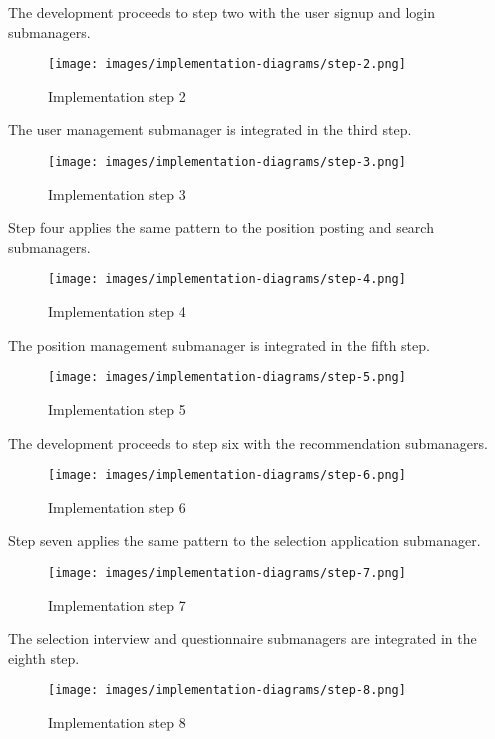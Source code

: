 The development proceeds to step two with the user signup and login submanagers.

\begin{figure}[h]
    \centering
    \texttt{[image: images/implementation-diagrams/step-2.png]}
    \caption{Implementation step 2}
\end{figure}

\clearpage
The user management submanager is integrated in the third step.

\begin{figure}[h]
    \centering
    \texttt{[image: images/implementation-diagrams/step-3.png]}
    \caption{Implementation step 3}
\end{figure}

\clearpage
Step four applies the same pattern to the position posting and search submanagers.

\begin{figure}[h]
    \centering
    \texttt{[image: images/implementation-diagrams/step-4.png]}
    \caption{Implementation step 4}
\end{figure}

\clearpage
The position management submanager is integrated in the fifth step.

\begin{figure}[h]
    \centering
    \texttt{[image: images/implementation-diagrams/step-5.png]}
    \caption{Implementation step 5}
\end{figure}

\clearpage
The development proceeds to step six with the recommendation submanagers.

\begin{figure}[h]
    \centering
    \texttt{[image: images/implementation-diagrams/step-6.png]}
    \caption{Implementation step 6}
\end{figure}

\clearpage
Step seven applies the same pattern to the selection application submanager.

\begin{figure}[h]
    \centering
    \texttt{[image: images/implementation-diagrams/step-7.png]}
    \caption{Implementation step 7}
\end{figure}

\clearpage
The selection interview and questionnaire submanagers are integrated in the eighth step.

\begin{figure}[h]
    \centering
    \texttt{[image: images/implementation-diagrams/step-8.png]}
    \caption{Implementation step 8}
\end{figure}

